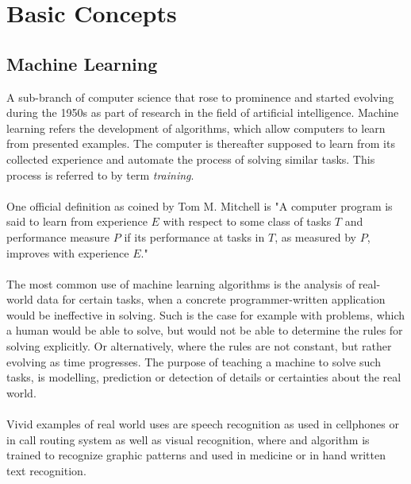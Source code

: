 \section{Basic Concepts}
	\subsection{Machine Learning}
		A sub-branch of computer science that rose to prominence and started evolving during the 1950s as part of research in the field of artificial intelligence. Machine learning refers the development of algorithms, which allow computers to learn from presented examples. The computer is thereafter supposed to learn from its collected experience and automate the process of solving similar tasks. This process is referred to by term \textit{training}.
		\\~\\
		One official definition as coined by Tom M. Mitchell \cite{mitchell} is  "A computer program is said to learn from experience $E$ with respect to some class of tasks $ T $ and performance measure $ P $ if its performance at tasks in $ T $, as measured by $ P $, improves with experience $ E $."
		\\~\\
		The most common use of machine learning algorithms is the analysis of real-world data for certain tasks, when a concrete programmer-written application would be ineffective in solving. Such is the case for example with problems, which a human would be able to solve, but would not be able to determine the rules for solving explicitly. Or alternatively, where the rules are not constant, but rather evolving as time progresses. The purpose of teaching a machine to solve such tasks, is modelling, prediction or detection of details or certainties about the real world. 
		\\~\\
		Vivid examples of real world uses are speech recognition as used in cellphones or in 
		call routing system as well as visual recognition, where and algorithm is trained to recognize graphic patterns and used in medicine or in hand written text recognition.
